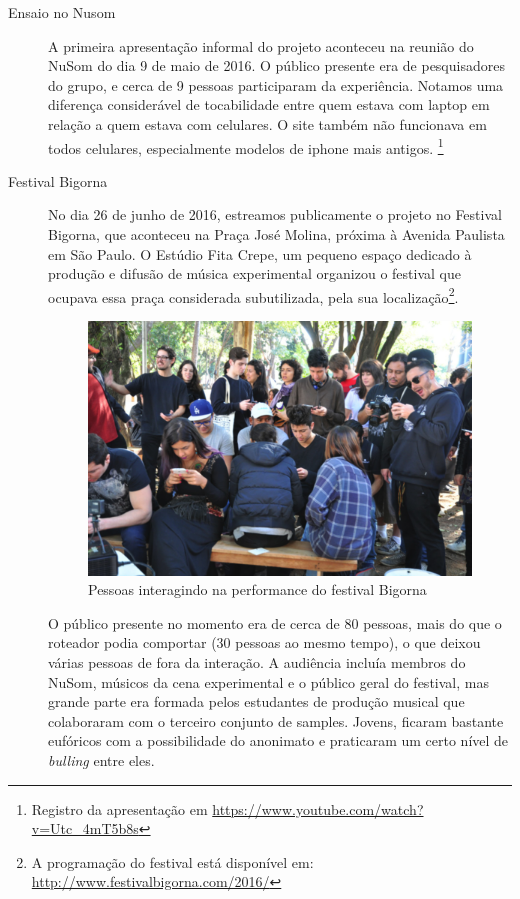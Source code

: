 \begin{description}

\item[Ensaio no Nusom] 
A primeira apresentação informal do projeto aconteceu na reunião do NuSom do dia 9 de maio de 2016. O público presente era de pesquisadores do grupo, e cerca de 9 pessoas participaram da experiência. Notamos uma diferença considerável de tocabilidade entre quem estava com laptop em relação a quem estava com celulares. O site também não funcionava em todos celulares, especialmente modelos de iphone mais antigos. \footnote{Registro da apresentação em \url{https://www.youtube.com/watch?v=Utc_4mT5b8s}}

\item[Festival Bigorna]
No dia 26 de junho de 2016, estreamos publicamente o projeto no Festival Bigorna, que aconteceu na Praça José Molina, próxima à Avenida Paulista em São Paulo. O Estúdio Fita Crepe, um pequeno espaço dedicado à produção e difusão de música experimental organizou o festival que ocupava essa praça considerada subutilizada, pela sua localização\footnote{A programação do festival está disponível em: \url{http://www.festivalbigorna.com/2016/}}.

\begin{figure}
        \includegraphics[width=1\textwidth]{pictures/bigorna}
        \vspace{-10pt}
    \caption{Pessoas interagindo na performance do festival Bigorna}
    \label{fig:bigorna}
\end{figure}

O público presente no momento era de cerca de 80 pessoas, mais do que o roteador podia comportar (30 pessoas ao mesmo tempo), o que deixou várias pessoas de fora da interação. A audiência incluía membros do NuSom, músicos da cena experimental e o público geral do festival, mas grande parte era formada pelos estudantes de produção musical que colaboraram com o terceiro conjunto de samples. Jovens, ficaram bastante eufóricos com a possibilidade do anonimato e praticaram um certo nível de \emph{bulling} entre eles. 


\end{description}
